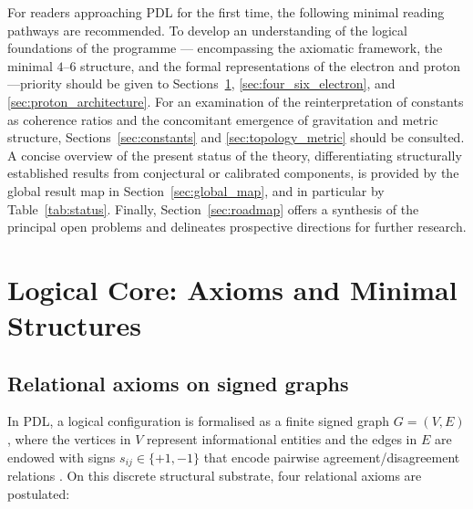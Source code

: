 \documentclass{article}
\begin{document}
For readers approaching PDL for the first time, the following minimal reading pathways are recommended. To develop an understanding of the logical foundations of the programme — encompassing the axiomatic framework, the minimal $4$--$6$ structure, and the formal representations of the electron and proton—priority should be given to Sections~\ref{sec:logical_core}, \ref{sec:four_six_electron}, and \ref{sec:proton_architecture}. For an examination of the reinterpretation of constants as coherence ratios and the concomitant emergence of gravitation and metric structure, Sections~\ref{sec:constants} and \ref{sec:topology_metric} should be consulted. A concise overview of the present status of the theory, differentiating structurally established results from conjectural or calibrated components, is provided by the global result map in Section~\ref{sec:global_map}, and in particular by Table~\ref{tab:status}. Finally, Section~\ref{sec:roadmap} offers a synthesis of the principal open problems and delineates prospective directions for further research.

\section{Logical Core: Axioms and Minimal Structures}
\label{sec:logical_core}

\subsection{Relational axioms on signed graphs}
\label{subsec:axioms}

In PDL, a logical configuration is formalised as a finite signed graph \(G = (V, E)\), where the vertices in \(V\) represent informational entities and the edges in \(E\) are endowed with signs \(s_{ij} \in \{+1, -1\}\) that encode pairwise agreement/disagreement relations \cite{PDL_Main_2026,PDL_intro}. On this discrete structural substrate, four relational axioms are postulated:
\end{document}
